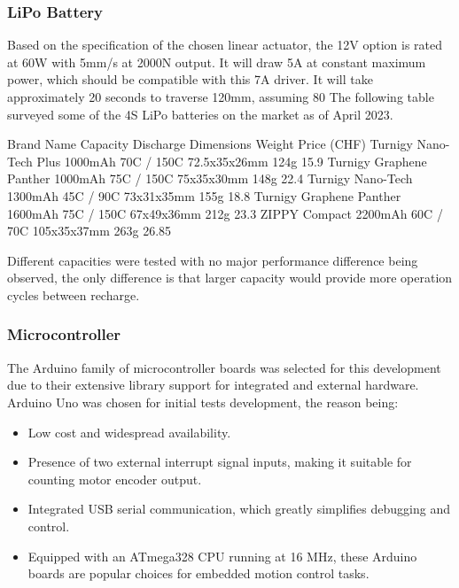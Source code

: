 \subsubsection{LiPo Battery}
\label{subsubsection:exploration_1_lipo_battery}

Based on the specification of the chosen linear actuator, the 12V option is rated at 60W with 5mm/s at 2000N output. It will draw 5A at constant maximum power, which should be compatible with this 7A driver. It will take approximately 20 seconds to traverse 120mm, assuming 80%
The following table surveyed some of the 4S LiPo batteries on the market as of April 2023. 

Brand Name
Capacity
Discharge 
Dimensions
Weight
Price (CHF)
Turnigy Nano-Tech Plus
1000mAh
70C / 150C
72.5x35x26mm
124g
15.9
Turnigy Graphene Panther 
1000mAh
75C / 150C
75x35x30mm
148g
22.4
Turnigy Nano-Tech
1300mAh
45C / 90C
73x31x35mm
155g
18.8
Turnigy Graphene Panther 
1600mAh
75C / 150C
 67x49x36mm
212g
23.3
ZIPPY Compact 
2200mAh
60C / 70C
105x35x37mm
263g
26.85

Different capacities were tested with no major performance difference being observed, the only difference is that larger capacity would provide more operation cycles between recharge.

\subsubsection{Microcontroller}
\label{subsubsection:exploration_1_microcontroller}

The Arduino family of microcontroller boards was selected for this development due to their extensive library support for integrated and external hardware. 
Arduino Uno was chosen for initial tests development, the reason being:
\begin{itemize}
    \item Low cost and widespread availability.
    \item Presence of two external interrupt signal inputs, making it suitable for counting motor encoder output. 
    \item Integrated USB serial communication, which greatly simplifies debugging and control.
    \item Equipped with an ATmega328 CPU running at 16 MHz, these Arduino boards are popular choices for embedded motion control tasks.
\end{itemize}

